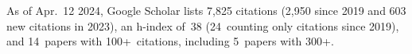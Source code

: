 %
As of Apr.~12 2024, Google Scholar lists
7,825 citations (2,950 since 2019 and 603 new citations in 2023),
an h-index of~38 (24~counting only citations since 2019),
and 14~papers with 100+~citations, including 5~papers with 300+.

